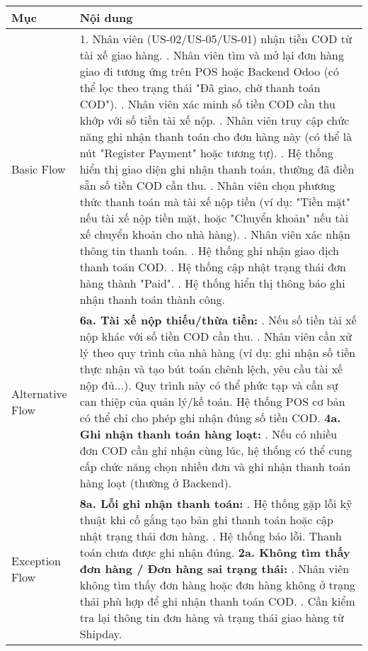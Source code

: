 \begin{longtable}{|m{4cm}|p{11cm}|}
\hline
\textbf{Mục} & \textbf{Nội dung} \\
\hline
Basic Flow & 1. Nhân viên (US-02/US-05/US-01) nhận tiền COD từ tài xế giao hàng. \newline 2. Nhân viên tìm và mở lại đơn hàng giao đi tương ứng trên POS hoặc Backend Odoo (có thể lọc theo trạng thái "Đã giao, chờ thanh toán COD"). \newline 3. Nhân viên xác minh số tiền COD cần thu khớp với số tiền tài xế nộp. \newline 4. Nhân viên truy cập chức năng ghi nhận thanh toán cho đơn hàng này (có thể là nút "Register Payment" hoặc tương tự). \newline 5. Hệ thống hiển thị giao diện ghi nhận thanh toán, thường đã điền sẵn số tiền COD cần thu. \newline 6. Nhân viên chọn phương thức thanh toán mà tài xế nộp tiền (ví dụ: "Tiền mặt" nếu tài xế nộp tiền mặt, hoặc "Chuyển khoản" nếu tài xế chuyển khoản cho nhà hàng). \newline 7. Nhân viên xác nhận thông tin thanh toán. \newline 8. Hệ thống ghi nhận giao dịch thanh toán COD. \newline 9. Hệ thống cập nhật trạng thái đơn hàng thành "Paid". \newline 10. Hệ thống hiển thị thông báo ghi nhận thanh toán thành công. \\
\hline
Alternative Flow & \textbf{6a. Tài xế nộp thiếu/thừa tiền:} \newline    1. Nếu số tiền tài xế nộp khác với số tiền COD cần thu. \newline    2. Nhân viên cần xử lý theo quy trình của nhà hàng (ví dụ: ghi nhận số tiền thực nhận và tạo bút toán chênh lệch, yêu cầu tài xế nộp đủ...). Quy trình này có thể phức tạp và cần sự can thiệp của quản lý/kế toán. Hệ thống POS cơ bản có thể chỉ cho phép ghi nhận đúng số tiền COD. \newline \textbf{4a. Ghi nhận thanh toán hàng loạt:} \newline    1. Nếu có nhiều đơn COD cần ghi nhận cùng lúc, hệ thống có thể cung cấp chức năng chọn nhiều đơn và ghi nhận thanh toán hàng loạt (thường ở Backend). \\
\hline
Exception Flow & \textbf{8a. Lỗi ghi nhận thanh toán:} \newline    1. Hệ thống gặp lỗi kỹ thuật khi cố gắng tạo bản ghi thanh toán hoặc cập nhật trạng thái đơn hàng. \newline    2. Hệ thống báo lỗi. Thanh toán chưa được ghi nhận đúng. \newline \textbf{2a. Không tìm thấy đơn hàng / Đơn hàng sai trạng thái:} \newline    1. Nhân viên không tìm thấy đơn hàng hoặc đơn hàng không ở trạng thái phù hợp để ghi nhận thanh toán COD. \newline    2. Cần kiểm tra lại thông tin đơn hàng và trạng thái giao hàng từ Shipday. \\

\end{longtable}
